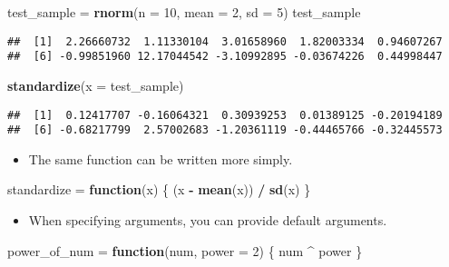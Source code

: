 \documentclass[]{book}
\newenvironment{Shaded}{\begin{snugshade}}{\end{snugshade}}
\newcommand{\KeywordTok}[1]{\textcolor[rgb]{0.13,0.29,0.53}{\textbf{#1}}}
\newcommand{\DataTypeTok}[1]{\textcolor[rgb]{0.13,0.29,0.53}{#1}}
\newcommand{\DecValTok}[1]{\textcolor[rgb]{0.00,0.00,0.81}{#1}}
\newcommand{\StringTok}[1]{\textcolor[rgb]{0.31,0.60,0.02}{#1}}
\newcommand{\ControlFlowTok}[1]{\textcolor[rgb]{0.13,0.29,0.53}{\textbf{#1}}}
\newcommand{\OperatorTok}[1]{\textcolor[rgb]{0.81,0.36,0.00}{\textbf{#1}}}
\newcommand{\NormalTok}[1]{#1}
\providecommand{\tightlist}{%
  \setlength{\itemsep}{0pt}\setlength{\parskip}{0pt}}
\begin{document}
\begin{Shaded}
\begin{Highlighting}[]
\NormalTok{test_sample =}\StringTok{ }\KeywordTok{rnorm}\NormalTok{(}\DataTypeTok{n =} \DecValTok{10}\NormalTok{, }\DataTypeTok{mean =} \DecValTok{2}\NormalTok{, }\DataTypeTok{sd =} \DecValTok{5}\NormalTok{)}
\NormalTok{test_sample}
\end{Highlighting}
\end{Shaded}

\begin{verbatim}
##  [1]  2.26660732  1.11330104  3.01658960  1.82003334  0.94607267
##  [6] -0.99851960 12.17044542 -3.10992895 -0.03674226  0.44998447
\end{verbatim}

\begin{Shaded}
\begin{Highlighting}[]
\KeywordTok{standardize}\NormalTok{(}\DataTypeTok{x =}\NormalTok{ test_sample)}
\end{Highlighting}
\end{Shaded}

\begin{verbatim}
##  [1]  0.12417707 -0.16064321  0.30939253  0.01389125 -0.20194189
##  [6] -0.68217799  2.57002683 -1.20361119 -0.44465766 -0.32445573
\end{verbatim}

\begin{itemize}
\tightlist
\item
  The same function can be written more simply.
\end{itemize}

\begin{Shaded}
\begin{Highlighting}[]
\NormalTok{standardize =}\StringTok{ }\ControlFlowTok{function}\NormalTok{(x) \{}
\NormalTok{  (x }\OperatorTok{-}\StringTok{ }\KeywordTok{mean}\NormalTok{(x)) }\OperatorTok{/}\StringTok{ }\KeywordTok{sd}\NormalTok{(x)}
\NormalTok{\}}
\end{Highlighting}
\end{Shaded}

\begin{itemize}
\tightlist
\item
  When specifying arguments, you can provide default arguments.
\end{itemize}

\begin{Shaded}
\begin{Highlighting}[]
\NormalTok{power_of_num =}\StringTok{ }\ControlFlowTok{function}\NormalTok{(num, }\DataTypeTok{power =} \DecValTok{2}\NormalTok{) \{}
\NormalTok{  num }\OperatorTok{^}\StringTok{ }\NormalTok{power}
\NormalTok{\}}
\end{Highlighting}
\end{Shaded}
\end{document}
